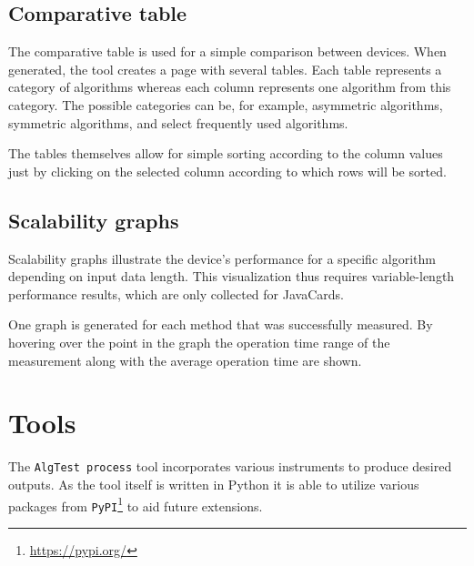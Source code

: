 \subsection{Comparative table}
The comparative table is used for a simple comparison between devices. When generated, the tool creates a page with several tables. Each table represents a category of algorithms whereas each column represents one algorithm from this category. The possible categories can be, for example, asymmetric algorithms, symmetric algorithms, and select frequently used algorithms.

The tables themselves allow for simple sorting according to the column values just by clicking on the selected column according to which rows will be sorted.


\subsection{Scalability graphs}
Scalability graphs illustrate the device's performance for a specific algorithm depending on input data length. This visualization thus requires variable-length performance results, which are only collected for JavaCards.

One graph is generated for each method that was successfully measured. By hovering over the point in the graph the operation time range of the measurement along with the average operation time are shown.





\section{Tools}\label{sec:tools}
The \texttt{AlgTest process} tool incorporates various instruments to produce desired outputs. As the tool itself is written in Python it is able to utilize various packages from \texttt{PyPI}\footnote{\url{https://pypi.org/}} to aid future extensions.

